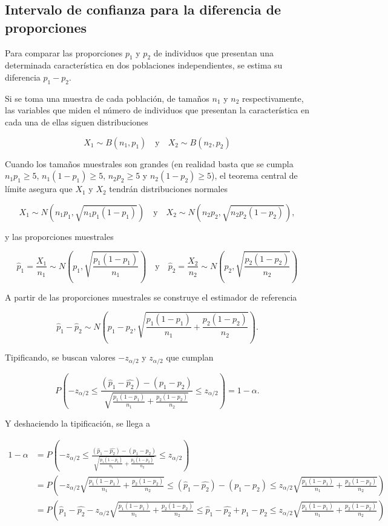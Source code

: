 \documentclass[
  spanish,
  a4paper,
]{scrreport}
\theoremstyle{plain}
\theoremstyle{definition}
\theoremstyle{definition}
\theoremstyle{remark}
\begin{document}
\subsection{Intervalo de confianza para la diferencia de
proporciones}\label{intervalo-de-confianza-para-la-diferencia-de-proporciones}

Para comparar las proporciones \(p_1\) y \(p_2\) de individuos que
presentan una determinada característica en dos poblaciones
independientes, se estima su diferencia \(p_1-p_2\).

Si se toma una muestra de cada población, de tamaños \(n_1\) y \(n_2\)
respectivamente, las variables que miden el número de individuos que
presentan la característica en cada una de ellas siguen distribuciones

\[
X_1\sim B(n_1,p_1)\quad \mbox{y}\quad X_2\sim B(n_2,p_2)
\]

Cuando los tamaños muestrales son grandes (en realidad basta que se
cumpla \(n_1p_1\geq 5\), \(n_1(1-p_1)\geq 5\), \(n_2p_2\geq 5\) y
\(n_2(1-p_2)\geq 5\)), el teorema central de límite asegura que \(X_1\)
y \(X_2\) tendrán distribuciones normales

\[
X_1\sim N(n_1p_1,\sqrt{n_1p_1(1-p_1)}) \quad \mbox{y}\quad X_2\sim N(n_2p_2,\sqrt{n_2p_2(1-p_2)}),
\]

y las proporciones muestrales

\[
\hat{p}_1=\frac{X_1}{n_1} \sim N\left(p_1,\sqrt{\frac{p_1(1-p_1)}{n_1}}\right) \quad \mbox{y}\quad
\hat{p}_2=\frac{X_2}{n_2} \sim N\left(p_2,\sqrt{\frac{p_2(1-p_2)}{n_2}}\right)
\]

A partir de las proporciones muestrales se construye el estimador de
referencia

\[
\hat{p}_1-\hat{p}_2\sim  N\left(p_1-p_2,\sqrt{\frac{p_1(1-p_1)}{n_1}+\frac{p_2(1-p_2)}{n_2}}\right).
\]

Tipificando, se buscan valores \(-z_{\alpha/2}\) y \(z_{\alpha/2}\) que
cumplan

\[
P\left(-z_{\alpha/2}\leq \frac{(\hat{p}_1-\hat{p_2})-(p_1-p_2)}{\sqrt{\frac{p_1(1-p_1)}{n_1}+\frac{p_2(1-p_2)}{n_2}}}\leq z_{\alpha/2} \right) = 1-\alpha.
\]

Y deshaciendo la tipificación, se llega a

\begin{align*}
1-\alpha 
&= P\left(-z_{\alpha/2}\leq \frac{(\hat{p}_1-\hat{p_2})-(p_1-p_2)}{\sqrt{\frac{p_1(1-p_1)}{n_1}+\frac{p_2(1-p_2)}{n_2}}}\leq z_{\alpha/2} \right) \\
&= P\left(-z_{\alpha/2}\sqrt{\frac{p_1(1-p_1)}{n_1}+\frac{p_2(1-p_2)}{n_2}}\leq (\hat{p}_1-\hat{p_2})-(p_1-p_2)\leq z_{\alpha/2}\sqrt{\frac{p_1(1-p_1)}{n_1}+\frac{p_2(1-p_2)}{n_2}} \right) \\
&= P\left(\hat{p}_1-\hat{p_2} -z_{\alpha/2}\sqrt{\frac{p_1(1-p_1)}{n_1}+\frac{p_2(1-p_2)}{n_2}}\leq \hat{p}_1-\hat{p_2} + p_1-p_2\leq z_{\alpha/2}\sqrt{\frac{p_1(1-p_1)}{n_1}+\frac{p_2(1-p_2)}{n_2}} \right)
\end{align*}
\end{document}
